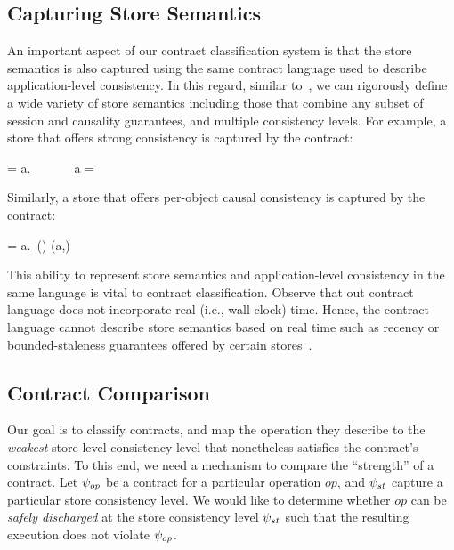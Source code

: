 \subsection{Capturing Store Semantics}
\label{sec:store_sem}

An important aspect of our contract classification system is that the store
semantics is also captured using the same contract language used to describe
application-level consistency. In this regard, similar
to~\cite{Burckhardt2014}, we can rigorously define a wide variety of store
semantics including those that combine any subset of session and causality
guarantees, and multiple consistency levels. For example, a store that offers
strong consistency is captured by the contract:

\vspace{-1em}
\begin{smathpar}
\scc = \forall a.~ \Rightarrow {} ~\vee~  ~\vee~ a = \cureff
\end{smathpar}

\noindent Similarly, a store that offers per-object causal consistency is captured by the
contract:

\vspace{-1em}
\begin{smathpar}
\ccc = \forall a.~(\hboZ \cap \sameobjZ) (a,\cureff) \Rightarrow {}
\end{smathpar}

\noindent This ability to represent store semantics and application-level consistency in
the same language is vital to contract classification. Observe that out
contract language does not incorporate real (i.e., wall-clock) time. Hence, the
contract language cannot describe store semantics based on real time such as
recency or bounded-staleness guarantees offered by certain
stores~\cite{Pileus}.

\subsection{Contract Comparison}

Our goal is to classify contracts, and map the operation they describe to
the \emph{weakest} store-level consistency level that  nonetheless
satisfies the contract's constraints. To this end, we need a mechanism to
compare the ``strength'' of a contract. Let $\psi_{op}$ be a contract for a
particular operation $op$, and $\psi_{st}$ capture a particular store
consistency level. We would like to determine whether $op$ can be
\emph{safely discharged} at the store consistency level $\psi_{st}$ such that
the resulting execution does not violate $\psi_{op}$.

